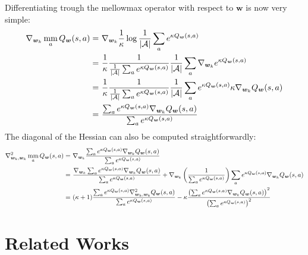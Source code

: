 \documentclass{article}
\newcommand{\mm}{\operatornamewithlimits{mm}}
\begin{document}
Differentiating trough the mellowmax operator with respect to $\bm{w}$ is now very simple:
\begin{align}
\nabla_{\bm{w}_k}\mm_a Q_{\bm{w}}(s,a) =\ & 
\nabla_{\bm{w}_k} \frac{1}{\kappa} \log \frac{1}{|\mathcal{A}|}\sum_a e^{\kappa Q_{\bm{w}}(s,a)} \\ =\ &
\frac{1}{\kappa}\frac{1}{\frac{1}{|\mathcal{A}|}\sum_a e^{\kappa Q_{\bm{w}}(s,a)}}\frac{1}{|\mathcal{A}|}\sum_a \nabla_{\bm{w}_k} e^{\kappa Q_{\bm{w}}(s,a)} \\ =\ &
\frac{1}{\kappa}\frac{1}{\frac{1}{|\mathcal{A}|}\sum_a e^{\kappa Q_{\bm{w}}(s,a)}}\frac{1}{|\mathcal{A}|}\sum_a e^{\kappa Q_{\bm{w}}(s,a)} \kappa \nabla_{\bm{w}_k} Q_{\bm{w}}(s,a) \\ =\ &
\frac{\sum_a e^{\kappa Q_{\bm{w}}(s,a)} \nabla_{\bm{w}_k} Q_{\bm{w}}(s,a)}{\sum_a e^{\kappa Q_{\bm{w}}(s,a)}}
\end{align}
The diagonal of the Hessian can also be computed straightforwardly:
\begin{align}
\nabla_{\bm{w}_k,\bm{w}_k}^2 \mm_a Q_{\bm{w}}(s,a) =\ &
\nabla_{\bm{w}_k}\frac{\sum_a e^{\kappa Q_{\bm{w}}(s,a)} \nabla_{\bm{w}_k} Q_{\bm{w}}(s,a)}{\sum_a e^{\kappa Q_{\bm{w}}(s,a)}} \\ =\ &
\frac{\nabla_{\bm{w}_k}\sum_a e^{\kappa Q_{\bm{w}}(s,a)} \nabla_{\bm{w}_k} Q_{\bm{w}}(s,a)}{\sum_a e^{\kappa Q_{\bm{w}}(s,a)}} + \nabla_{\bm{w}_k}\left( \frac{1}{\sum_a e^{\kappa Q_{\bm{w}}(s,a)}} \right)\sum_a e^{\kappa Q_{\bm{w}}(s,a)} \nabla_{\bm{w}_k} Q_{\bm{w}}(s,a) \\ =\ &
(\kappa + 1)\frac{\sum_a e^{\kappa Q_{\bm{w}}(s,a)} \nabla_{\bm{w}_k,\bm{w}_k}^2 Q_{\bm{w}}(s,a)}{\sum_a e^{\kappa Q_{\bm{w}}(s,a)}} - \kappa\frac{\left(\sum_a e^{\kappa Q_{\bm{w}}(s,a)} \nabla_{\bm{w}_k} Q_{\bm{w}}(s,a)\right)^2}{\left(\sum_a e^{\kappa Q_{\bm{w}}(s,a)}\right)^2}
\end{align}

\section{Related Works}
\end{document}
